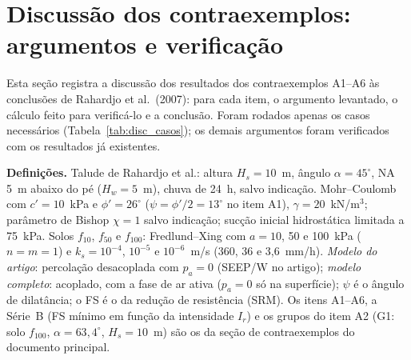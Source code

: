 \section{Discuss\~ao dos contraexemplos: argumentos e verifica\c{c}\~ao}\label{sec:discussao}

Esta se\c{c}\~ao registra a discuss\~ao dos resultados dos contraexemplos A1--A6 \`as conclus\~oes de Rahardjo et al.\
(2007): para cada item, o argumento levantado, o c\'alculo feito para verific\'a-lo e a conclus\~ao. Foram rodados
apenas os casos necess\'arios (Tabela~\ref{tab:disc_casos}); os demais argumentos foram verificados com os resultados
j\'a existentes.

\textbf{Defini\c{c}\~oes.} Talude de Rahardjo et al.: altura $H_s=10$~m, \^angulo $\alpha=45^\circ$, NA 5~m abaixo do
p\'e ($H_w=5$~m), chuva de 24~h, salvo indica\c{c}\~ao. Mohr--Coulomb com $c'=10$~kPa e $\phi'=26^\circ$
($\psi=\phi'/2=13^\circ$ no item A1), $\gamma=20$~kN/m$^3$; par\^ametro de Bishop $\chi=1$ salvo indica\c{c}\~ao;
suc\c{c}\~ao inicial hidrost\'atica limitada a 75~kPa. Solos $f_{10}$, $f_{50}$ e $f_{100}$: Fredlund--Xing com
$a=10$, 50 e 100~kPa ($n=m=1$) e $k_s=10^{-4}$, $10^{-5}$ e $10^{-6}$~m/s (360, 36 e 3,6~mm/h). \emph{Modelo do
artigo}: percola\c{c}\~ao desacoplada com $p_a=0$ (SEEP/W no artigo); \emph{modelo completo}: acoplado, com a fase de ar
ativa ($p_a=0$ s\'o na superf\'icie); $\psi$ \'e o \^angulo de dilat\^ancia; o FS \'e o da redu\c{c}\~ao de resist\^encia
(SRM). Os itens A1--A6, a S\'erie~B (FS m\'inimo em fun\c{c}\~ao da intensidade $I_r$) e os grupos do item A2 (G1: solo
$f_{100}$, $\alpha=63{,}4^\circ$, $H_s=10$~m) s\~ao os da se\c{c}\~ao de contraexemplos do documento principal.

